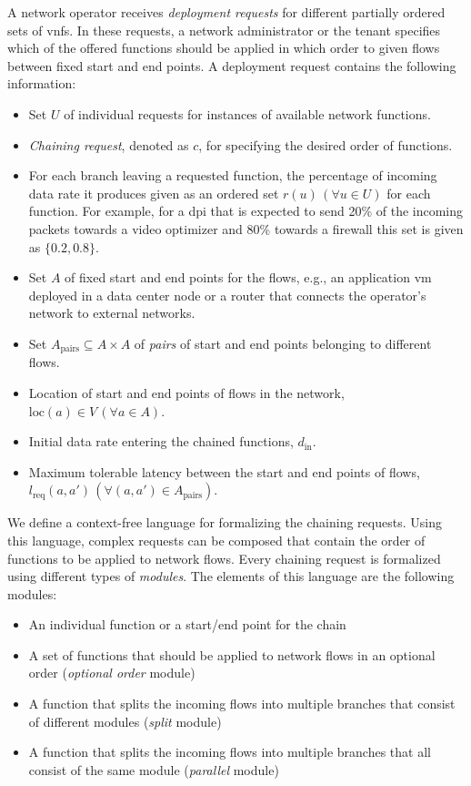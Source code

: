 \documentclass[10pt,a4paper,conference]{IEEEtran}
\begin{document}
A network operator receives \emph{deployment requests} for different partially ordered sets 
of \acp{vnf}. In these requests, a network administrator or the tenant specifies which 
of the offered functions should be applied in which order to given flows
between fixed start and end points. A deployment request contains the following information:
\begin{itemize}
 \item Set $ U $ of individual requests for instances of available network functions.
 \item \emph{Chaining request}, denoted as $ c $, for specifying the desired order of functions.
\item For each branch leaving a requested function, the percentage of incoming
 data rate it produces given as an ordered set $ r(u) \, (\forall u {\in} U) $ for each function.
 For example, for a \ac{dpi} that is expected to send 20\% of the incoming packets 
 towards a video optimizer and 80\% towards a firewall this set is given as $ \{ 0.2,0.8 \} $.
 \item Set $ A $ of fixed start and end points for the flows, e.g., an application 
 \ac{vm} deployed in a data center node or 
 a router that connects the operator's network to external networks. 
 \item Set $ A_{\text{pairs}} {\subseteq} A {\times} A $ of \emph{pairs} of start 
 and end points belonging to different flows.
 \item Location of start and end points of flows in the network, $ \text{loc}(a) {\in} V \, (\forall a {\in} A) $.
 \item Initial data rate entering the chained functions, $ d_{\text{in}} $.
 \item Maximum tolerable latency between the start and end points of flows, 
 $ l_{\text{req}}(a,a') \, (\forall (a,a') {\in} A_{\text{pairs}}) $.
\end{itemize}


We define a context-free language for formalizing the chaining requests. Using this 
language, complex requests can be composed that contain the order of functions to 
be applied to network flows. Every chaining request is 
formalized using different types of \emph{modules}. The elements of this language 
are the following modules:
\begin{itemize}
 \item An individual function or a start/end point for the chain
 \item A set of functions that should be applied to network flows in
 an optional order (\emph{optional order} module)
 \item A function that splits the incoming flows into multiple branches
 that consist of different modules (\emph{split} module)
 \item A function that splits the incoming flows into multiple branches 
 that all consist of the same module (\emph{parallel} module)
\end{itemize}
\end{document}
